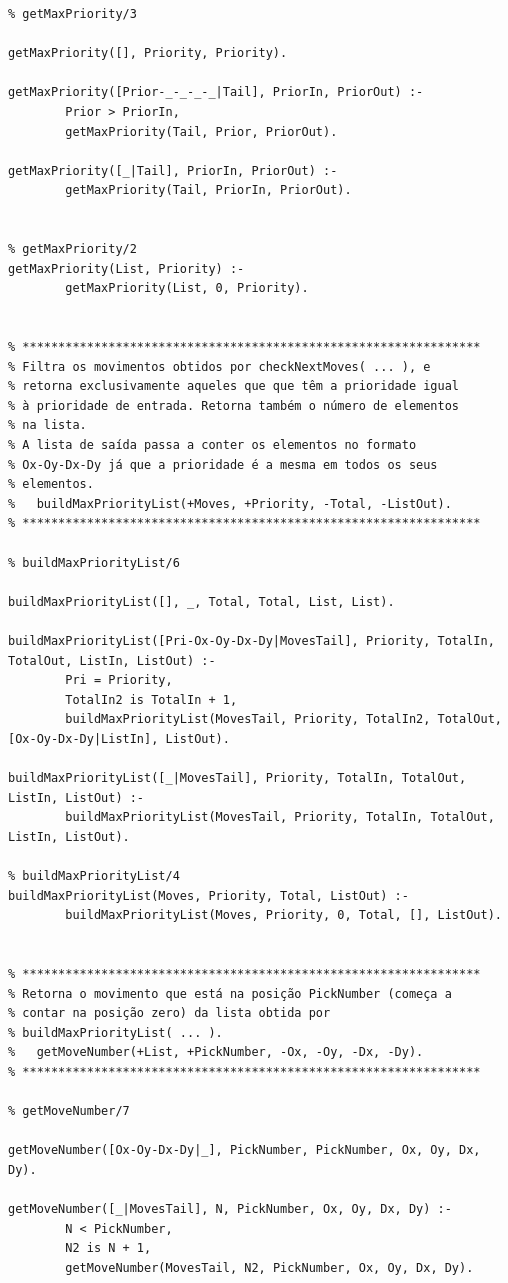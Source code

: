 \documentclass[15pt,a4paper]{article}
\begin{document}
\begin{lstlisting}
% getMaxPriority/3

getMaxPriority([], Priority, Priority).

getMaxPriority([Prior-_-_-_-_|Tail], PriorIn, PriorOut) :-
		Prior > PriorIn,
		getMaxPriority(Tail, Prior, PriorOut).

getMaxPriority([_|Tail], PriorIn, PriorOut) :-
		getMaxPriority(Tail, PriorIn, PriorOut).

		
% getMaxPriority/2
getMaxPriority(List, Priority) :-
		getMaxPriority(List, 0, Priority).
		

% ****************************************************************
% Filtra os movimentos obtidos por checkNextMoves( ... ), e
% retorna exclusivamente aqueles que que têm a prioridade igual
% à prioridade de entrada. Retorna também o número de elementos
% na lista.
% A lista de saída passa a conter os elementos no formato 
% Ox-Oy-Dx-Dy já que a prioridade é a mesma em todos os seus
% elementos.
%	buildMaxPriorityList(+Moves, +Priority, -Total, -ListOut).
% ****************************************************************

% buildMaxPriorityList/6

buildMaxPriorityList([], _, Total, Total, List, List).

buildMaxPriorityList([Pri-Ox-Oy-Dx-Dy|MovesTail], Priority, TotalIn, TotalOut, ListIn, ListOut) :-
		Pri = Priority,
		TotalIn2 is TotalIn + 1,
		buildMaxPriorityList(MovesTail, Priority, TotalIn2, TotalOut, [Ox-Oy-Dx-Dy|ListIn], ListOut).

buildMaxPriorityList([_|MovesTail], Priority, TotalIn, TotalOut, ListIn, ListOut) :-
		buildMaxPriorityList(MovesTail, Priority, TotalIn, TotalOut, ListIn, ListOut).

% buildMaxPriorityList/4
buildMaxPriorityList(Moves, Priority, Total, ListOut) :-
		buildMaxPriorityList(Moves, Priority, 0, Total, [], ListOut).


% ****************************************************************
% Retorna o movimento que está na posição PickNumber (começa a
% contar na posição zero) da lista obtida por
% buildMaxPriorityList( ... ).
%	getMoveNumber(+List, +PickNumber, -Ox, -Oy, -Dx, -Dy).
% ****************************************************************

% getMoveNumber/7

getMoveNumber([Ox-Oy-Dx-Dy|_], PickNumber, PickNumber, Ox, Oy, Dx, Dy).

getMoveNumber([_|MovesTail], N, PickNumber, Ox, Oy, Dx, Dy) :-
		N < PickNumber,
		N2 is N + 1,
		getMoveNumber(MovesTail, N2, PickNumber, Ox, Oy, Dx, Dy).


\end{lstlisting}
\end{document}
